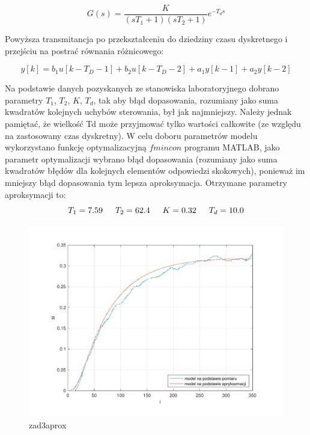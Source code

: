 $$G(s)=\frac{K}{(sT_{1}+1)(sT_{2}+1)}e^{-T_{d}s}$$

Powyższa transmitancja po przekształceniu do dziedziny czasu dyskretnego i przejściu na postrać równania różnicowego:

$$y[k]=b_{1}u[k-T_{D}-1]+b_{2}u[k-T_{D}-2]+a_{1}y[k-1]+a_{2}y[k-2]$$
 
Na podstawie danych pozyskanych ze stanowiska laboratoryjnego dobrano parametry 
$T_{1}$, $T_{2}$, $K$, $T_{d}$, tak aby błąd dopasowania, 
rozumiany jako suma kwadratów kolejnych uchybów sterowania, był jak najmniejszy. 
Należy jednak pamiętać, że wielkość Td może przyjmować tylko wartości całkowite 
(ze względu na zastosowany czas dyskretny). 
W celu doboru parametrów modelu wykorzystano funkcję optymalizacyjną $fmincon$ programu MATLAB, 
jako parametr optymalizacji wybrano błąd dopasowania 
(rozumiany jako suma kwadratów błędów dla kolejnych elementów odpowiedzi skokowych), 
ponieważ im mniejszy błąd dopasowania tym lepsza aproksymacja. \newline
Otrzymane parametry aproksymacji to: \newline
\indent $$T_{1}=\num{7.59}
\indent T_{2}=\num{62.4}
\indent K=\num{0.32}
\indent T_{d}=\num{10.0}$$

\begin{figure}[H]
    \centering
    \includegraphics[scale=0.75]{../lab/zad_3/zad3aprox.pdf}
    \caption{zad3aprox}
\end{figure}

